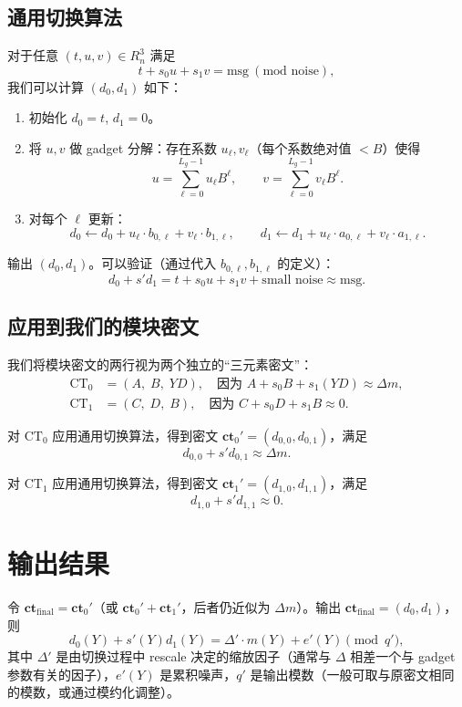 \documentclass{article}
\begin{document}
\subsection{通用切换算法}
对于任意 $(t, u, v) \in R_n^3$ 满足
\[
t + s_0 u + s_1 v = \mathrm{msg} \ (\text{mod noise}),
\]
我们可以计算 $(d_0, d_1)$ 如下：

\begin{enumerate}
\item 初始化 $d_0 = t$, $d_1 = 0$。
\item 将 $u, v$ 做 gadget 分解：存在系数 $u_\ell, v_\ell$（每个系数绝对值 $<B$）使得
\[
u = \sum_{\ell=0}^{L_g-1} u_\ell B^\ell, \qquad v = \sum_{\ell=0}^{L_g-1} v_\ell B^\ell.
\]
\item 对每个 $\ell$ 更新：
\[
d_0 \leftarrow d_0 + u_\ell \cdot b_{0,\ell} + v_\ell \cdot b_{1,\ell}, \qquad
d_1 \leftarrow d_1 + u_\ell \cdot a_{0,\ell} + v_\ell \cdot a_{1,\ell}.
\]
\end{enumerate}
输出 $(d_0, d_1)$。可以验证（通过代入 $b_{0,\ell}, b_{1,\ell}$ 的定义）：
\[
d_0 + s' d_1 = t + s_0 u + s_1 v + \text{small noise} \approx \mathrm{msg}.
\]

\subsection{应用到我们的模块密文}
我们将模块密文的两行视为两个独立的“三元素密文”：
\begin{align}
\mathrm{CT}_0 &= (A,\; B,\; Y D), \quad \text{因为 } A + s_0 B + s_1 (Y D) \approx \Delta m, \\
\mathrm{CT}_1 &= (C,\; D,\; B), \quad \text{因为 } C + s_0 D + s_1 B \approx 0.
\end{align}

对 $\mathrm{CT}_0$ 应用通用切换算法，得到密文 $\mathbf{ct}_0' = (d_{0,0}, d_{0,1})$，满足
\[
d_{0,0} + s' d_{0,1} \approx \Delta m.
\]

对 $\mathrm{CT}_1$ 应用通用切换算法，得到密文 $\mathbf{ct}_1' = (d_{1,0}, d_{1,1})$，满足
\[
d_{1,0} + s' d_{1,1} \approx 0.
\]

\section{输出结果}

令 $\mathbf{ct}_{\text{final}} = \mathbf{ct}_0'$（或 $\mathbf{ct}_0' + \mathbf{ct}_1'$，后者仍近似为 $\Delta m$）。输出 $\mathbf{ct}_{\text{final}} = (d_0, d_1)$，则
\[
d_0(Y) + s'(Y) d_1(Y) = \Delta' \cdot m(Y) + e'(Y) \pmod{q'},
\]
其中 $\Delta'$ 是由切换过程中 rescale 决定的缩放因子（通常与 $\Delta$ 相差一个与 gadget 参数有关的因子），$e'(Y)$ 是累积噪声，$q'$ 是输出模数（一般可取与原密文相同的模数，或通过模约化调整）。
\end{document}
